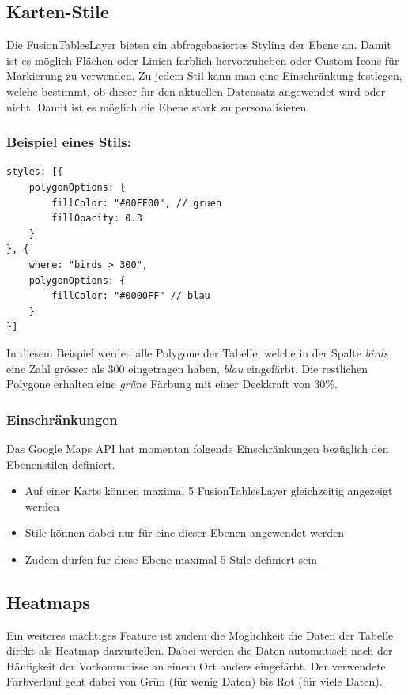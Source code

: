 \subsection{Karten-Stile}
Die FusionTablesLayer bieten ein abfragebasiertes Styling der Ebene an. Damit ist es möglich Flächen oder Linien farblich hervorzuheben oder Custom-Icons für Markierung zu verwenden. Zu jedem Stil kann man eine Einschränkung festlegen, welche bestimmt, ob dieser für den aktuellen Datensatz angewendet wird oder nicht. Damit ist es möglich die Ebene stark zu personalisieren.

\subsubsection{Beispiel eines Stils:}
\lstset{language=JavaScript}
\begin{lstlisting}
styles: [{
	polygonOptions: {
		fillColor: "#00FF00", // gruen
		fillOpacity: 0.3
	}
}, {
	where: "birds > 300",
	polygonOptions: {
		fillColor: "#0000FF" // blau
	}
}]
\end{lstlisting}

In diesem Beispiel werden alle Polygone der Tabelle, welche in der Spalte \emph{birds} eine Zahl grösser als 300 eingetragen haben, \emph{blau} eingefärbt. Die restlichen Polygone erhalten eine \emph{grüne} Färbung mit einer Deckkraft von 30\%.

\subsubsection{Einschränkungen}
Das Google Maps API hat momentan folgende Einschränkungen bezüglich den Ebenenstilen definiert.

\begin{itemize}
\item Auf einer Karte können maximal 5 FusionTablesLayer gleichzeitig angezeigt werden
\item Stile können dabei nur für eine dieser Ebenen angewendet werden
\item Zudem dürfen für diese Ebene maximal 5 Stile definiert sein
\end{itemize}

\subsection{Heatmaps}
Ein weiteres mächtiges Feature ist zudem die Möglichkeit die Daten der Tabelle direkt als Heatmap darzustellen. Dabei werden die Daten automatisch nach der Häufigkeit der Vorkommnisse an einem Ort anders eingefärbt. Der verwendete Farbverlauf geht dabei von Grün (für wenig Daten) bis Rot (für viele Daten). 


